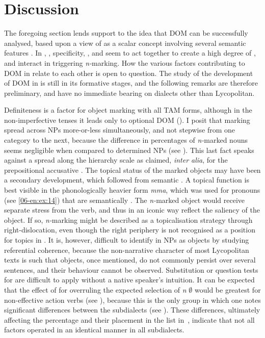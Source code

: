\documentclass[output=paper]{LSP/langsci}
\begin{document}
\section{Discussion}
\label{06-en-sec:6}

The foregoing section lends support to the idea that  DOM can be successfully analysed, based upon a view of  as a scalar concept involving several semantic features \citep{Hopperetal1980Transitivity}. In , , specificity, , and  seem to act together to create a high degree of , and interact in triggering \textit{n-}marking. How the various factors contributing to DOM in  relate to each other is open to question. The study of the development of DOM in  is still in its formative stages, and the following remarks are therefore preliminary, and have no immediate bearing on  dialects other than Lycopolitan. 

Definiteness is a factor for object marking with all TAM forms, although in the non-imperfective tenses it leads only to optional DOM (\cf {}). I posit that marking spread across  NPs more-or-less simultaneously, and not stepwise from one  category to the next, because the difference in percentages of \textit{n-}marked nouns seems negligible when compared to determined NPs (see ). This last fact speaks against a spread along the  hierarchy scale as claimed, \textit{inter alia}, for the  prepositional accusative \citep{Aissen2003Differential}. The topical status of the marked objects may have been a secondary development, which followed from semantic . A topical function is best visible in the phonologically heavier form \textit{mma}, which was used for pronouns (see \ref{06-en:ex:14}) that are semantically . The \textit{n-}marked object would receive separate stress from the verb, and thus in an iconic way reflect the saliency of the object. If so, \textit{n-}marking might be described as a topicalisation strategy through right-dislocation, even though the right periphery is not recognised as a position for topics in . It is, however, difficult to identify  in NPs as objects by studying referential coherence, because the non-narrative character of most Lycopolitan texts is such that objects, once mentioned, do not commonly persist over several sentences, and their behaviour cannot be observed. Substitution or question tests for  are difficult to apply without a native speaker’s intuition. It can be expected that the effect of  for overruling the expected selection of \textit{n} \vs ${\emptyset}$ would be greatest for non-effective action verbs (see ), because this is the only group in which one notes significant differences between the subdialects (see ). These differences, ultimately affecting the percentage and their placement in the list in~, indicate that not all factors operated in an identical manner in all subdialects.
\end{document}
